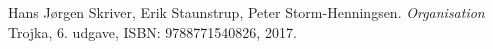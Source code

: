 \begin{thebibliography}{9}

Hans Jørgen Skriver, Erik Staunstrup, Peter Storm-Henningsen.
\textit{Organisation}
Trojka, 6. udgave, ISBN: 9788771540826, 2017.

\begin{comment}
\bibitem{latexcompanion} 
Michel Goossens, Frank Mittelbach, and Alexander Samarin. 
\textit{The \LaTeX\ Companion}. 
Addison-Wesley, Reading, Massachusetts, 1993.
 
\bibitem{einstein} 
Albert Einstein. 
\textit{Zur Elektrodynamik bewegter K{\"o}rper}. (German) 
[\textit{On the electrodynamics of moving bodies}]. 
Annalen der Physik, 322(10):891–921, 1905.
 
\bibitem{knuthwebsite} 
Knuth: Computers and Typesetting,
\\\texttt{http://www-cs-faculty.stanford.edu/\~{}uno/abcde.html}
\end{comment}
\end{thebibliography}
 
